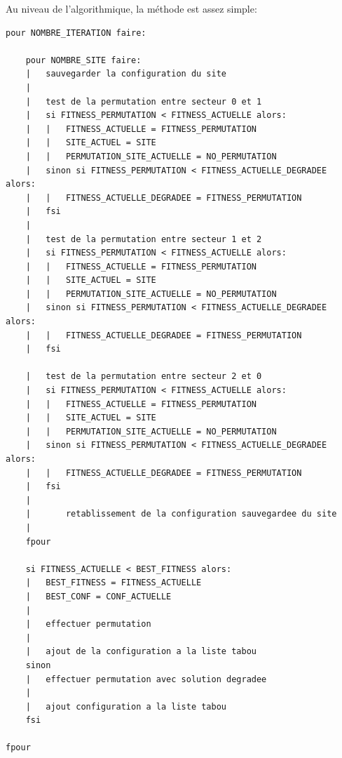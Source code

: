 \documentclass[a4paper, 11pt]{report}
\begin{document}
	Au niveau de l'algorithmique, la méthode est assez simple:\\	\begin{lstlisting}
pour NOMBRE_ITERATION faire:

	pour NOMBRE_SITE faire:
	|	sauvegarder la configuration du site
	|
	|	test de la permutation entre secteur 0 et 1
	|	si FITNESS_PERMUTATION < FITNESS_ACTUELLE alors:
	|	|	FITNESS_ACTUELLE = FITNESS_PERMUTATION
	|	|	SITE_ACTUEL = SITE
	|	|	PERMUTATION_SITE_ACTUELLE = NO_PERMUTATION
	|	sinon si FITNESS_PERMUTATION < FITNESS_ACTUELLE_DEGRADEE alors:
	|	|	FITNESS_ACTUELLE_DEGRADEE = FITNESS_PERMUTATION
	|	fsi
	|	
	|	test de la permutation entre secteur 1 et 2
	|	si FITNESS_PERMUTATION < FITNESS_ACTUELLE alors:
	|	|	FITNESS_ACTUELLE = FITNESS_PERMUTATION
	|	|	SITE_ACTUEL = SITE
	|	|	PERMUTATION_SITE_ACTUELLE = NO_PERMUTATION
	|	sinon si FITNESS_PERMUTATION < FITNESS_ACTUELLE_DEGRADEE alors:
	|	|	FITNESS_ACTUELLE_DEGRADEE = FITNESS_PERMUTATION
	|	fsi
	
	|	test de la permutation entre secteur 2 et 0
	|	si FITNESS_PERMUTATION < FITNESS_ACTUELLE alors:
	|	|	FITNESS_ACTUELLE = FITNESS_PERMUTATION
	|	|	SITE_ACTUEL = SITE
	|	|	PERMUTATION_SITE_ACTUELLE = NO_PERMUTATION
	|	sinon si FITNESS_PERMUTATION < FITNESS_ACTUELLE_DEGRADEE alors:
	|	|	FITNESS_ACTUELLE_DEGRADEE = FITNESS_PERMUTATION
	|	fsi
	|   
	|   	retablissement de la configuration sauvegardee du site
	|
	fpour
	
	si FITNESS_ACTUELLE < BEST_FITNESS alors:
	|	BEST_FITNESS = FITNESS_ACTUELLE
	|	BEST_CONF = CONF_ACTUELLE
	|	
	|	effectuer permutation
	|
	|	ajout de la configuration a la liste tabou
	sinon 
	| 	effectuer permutation avec solution degradee
	|
	|	ajout configuration a la liste tabou
	fsi

fpour
		
\end{lstlisting}

\vspace*{1cm}
\end{document}
